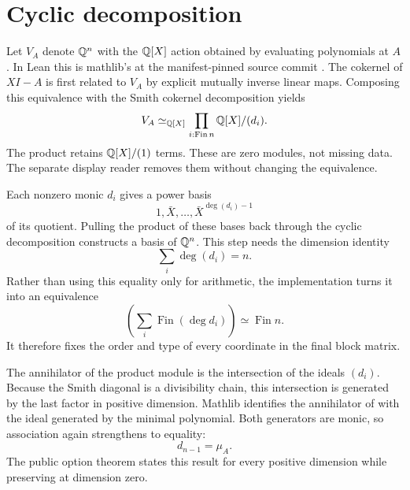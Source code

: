 \section{Cyclic decomposition}

Let $V_A$ denote $\mathbb{Q}^n$ with the $\mathbb{Q}[X]$ action obtained by evaluating
polynomials at $A$.  In Lean this is mathlib's  at the
manifest-pinned source commit \citep{mathlib4320aeval}.
The cokernel of $XI-A$ is first related to $V_A$ by explicit mutually inverse
linear maps.  Composing this equivalence with the Smith cokernel
decomposition yields
\[
  V_A \simeq_{\mathbb{Q}[X]}
  \prod_{i:\operatorname{Fin} n}\mathbb{Q}[X]/(d_i).
\]
The product retains $\mathbb{Q}[X]/(1)$ terms.  These are zero modules, not missing
data.  The separate display reader removes them without changing the
equivalence.

Each nonzero monic $d_i$ gives a power basis
\[
  1,\bar X,\ldots,\bar X^{\deg(d_i)-1}
\]
of its quotient.  Pulling the product of these bases back through the cyclic
decomposition constructs a basis of $\mathbb{Q}^n$.  This step needs the dimension
identity
\[
  \sum_i \deg(d_i)=n.
\]
Rather than using this equality only for arithmetic, the implementation turns
it into an equivalence
\[
  \left(\sum_i \operatorname{Fin}(\deg d_i)\right)
  \simeq \operatorname{Fin} n.
\]
It therefore fixes the order and type of every coordinate in the final block
matrix.

The annihilator of the product module is the intersection of the ideals
$(d_i)$.  Because the Smith diagonal is a divisibility chain, this
intersection is generated by the last factor in positive dimension.
Mathlib identifies the annihilator of  with the ideal
generated by the minimal polynomial.  Both generators are monic, so
association again strengthens to equality:
\[
  d_{n-1}=\mu_A.
\]
The public option theorem states this result for every positive dimension
while preserving  at dimension zero.
